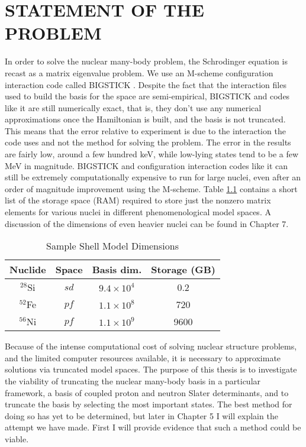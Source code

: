 \chapter{STATEMENT OF THE PROBLEM}
\label{chap:purpose}

In order to solve the nuclear many-body problem, the Schrodinger equation is recast
as a matrix eigenvalue problem.
We use an M-scheme configuration interaction code called BIGSTICK \cite{Johnson13}\cite{Johnson18}. 
Despite the fact that the interaction files used to build the basis for the space are
semi-empirical, BIGSTICK and codes like it are still numerically exact, that is, 
they don't use any numerical approximations once the Hamiltonian is built, and 
the basis is not truncated. This means that the error relative to experiment is
due to the interaction the code uses and not the method for solving the problem. 
The error in the results are fairly low, around a few 
hundred keV, while low-lying states tend to be a few MeV in magnitude.
BIGSTICK and configuration interaction codes like it can still be extremely computationally 
expensive to run for large nuclei, even after an order of magnitude improvement
using the M-scheme. Table \ref{memory} contains a short list of the storage space 
(RAM) required to store just the nonzero matrix elements
for various nuclei in different phenomenological model spaces.  
A discussion of the dimensions of even heavier nuclei can be found in Chapter 7.

\begin{table}[h!]
    \caption{Sample Shell Model Dimensions}
    \label{memory}
\begin{tabular}
    {c|c|c|c}
    \hline
    \hline
    Nuclide   & Space & Basis dim. & Storage\cite{Johnson13,Johnson18} (GB)\\
    \hline 
    $^{28}$Si & $sd$ & $9.4\times 10^4$ & 0.2 \\
    $^{52}$Fe & $pf$ & $1.1 \times 10^8$ & 720 \\
    $^{56}$Ni & $pf$ & $1.1 \times 10^9$ & 9600 \\
    \hline
    \hline
\end{tabular}

\end{table} 

Because of the intense computational cost of solving nuclear
structure problems, and the limited computer resources available,
it is necessary to approximate solutions via truncated model spaces.
The purpose of this thesis is to investigate the viability of 
truncating the nuclear many-body basis in a particular framework, 
a basis of coupled proton and neutron Slater determinants, and 
to truncate the basis by selecting the most important states. 
The best method for doing so has yet to be determined, but later in Chapter 5 I will
explain the attempt we have made. First I will provide
evidence that such a method could be viable. 

